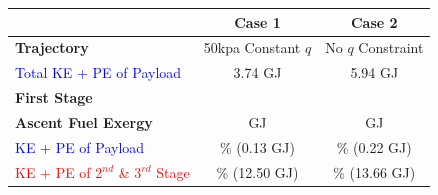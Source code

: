  \begin{table}[!ht] %
 	\centering
 	\begin{tabular}{l c c} 
 		& \textbf{Case 1} & \textbf{Case 2} \\
 		\hline \textbf{Trajectory}
 		& 50kpa Constant $q$
 		& No $q$ Constraint
 		\\
 		\textcolor{blue}{Total KE + PE of Payload}
 		& 3.74 GJ
 		& 5.94 GJ
 		\\
 		\textbf{First Stage}& & \\
 		\textbf{Ascent Fuel Exergy} 
 		&\textbf{\firstEnergyConstqNoReturn} GJ
 		&\textbf{\firstEnergyStandardNoReturn} GJ
 		\\
 		
 		\textcolor{blue}{KE + PE of Payload}
 		& \firstWpayloadConstqNoReturn \% (0.13 GJ)
 		& \firstWpayloadStandardNoReturn \% (0.22 GJ)
 		\\
 		\textcolor{red}{KE + PE of  2$^{nd}$ \& 3$^{rd}$ Stage}
 		& \firstWnextStageConstqNoReturn \% (12.50 GJ) & \firstWnextStageStandardNoReturn \% (13.66 GJ)
 		\\
 		

\end{tabular}
\end{table}

